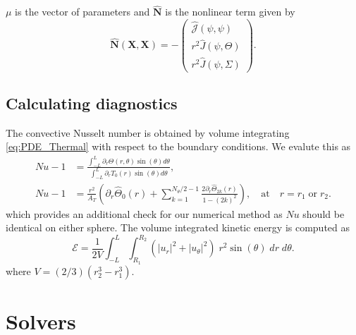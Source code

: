 \documentclass[a4paper]{article}
\begin{document}
$\mu$ is the vector of parameters and $\hat{\boldsymbol{N}}$ is the nonlinear term given by
\begin{equation}
\hat{\boldsymbol{N}} ( \boldsymbol{X}, \boldsymbol{X} )  = - \begin{pmatrix} 
\hat{\mathcal{J}}(\psi,\psi)  \\ 
r^2 \hat{J}(\psi,\Theta) \\ 
r^2 \hat{J}(\psi,\Sigma) 
\end{pmatrix}.
\end{equation}

\subsection{Calculating diagnostics}

The convective Nusselt number is obtained by volume integrating \eqref{eq:PDE_Thermal} with respect to the boundary conditions. We evalute this as 
\begin{equation}
\begin{aligned}
Nu - 1 &= \frac{\int_{-L}^L \partial_r \Theta(r,\theta) \sin(  \theta) d \theta  }{\int_{-L}^L \partial_r T_0(r) \sin(  \theta) d \theta}, \\
Nu - 1 &= \frac{r^2}{A_T} \left( \partial_r \hat{\Theta}_{0}(r) + \sum_{k=1}^{N_{\theta}/2 - 1}  \frac{ 2 \partial_r \hat{\Theta}_{2k}(r) }{1-{(2k)}^2} \right),  \quad \text{at} \quad r = r_1 \; \text{or} \; r_2.
\end{aligned}
\label{eq:Nusselt_Temperature_Spectral}    
\end{equation}
which provides an additional check for our numerical method as $Nu$ should be identical on either sphere. The volume integrated kinetic energy is computed as
\begin{equation}
\mathcal{E} = \frac{1}{2V} \int_{-L}^L \int_{R_1}^{R_2} ( |u_r|^2 + |u_{\theta}|^2 ) \; r^2 \sin (\theta) \; dr \; d \theta.
\label{eq:Kinetic_Energy_Spectral}    
\end{equation}
where $V = (2/3)(r_2^3 - r_1^3)$.


\clearpage


\section{Solvers}
\end{document}
